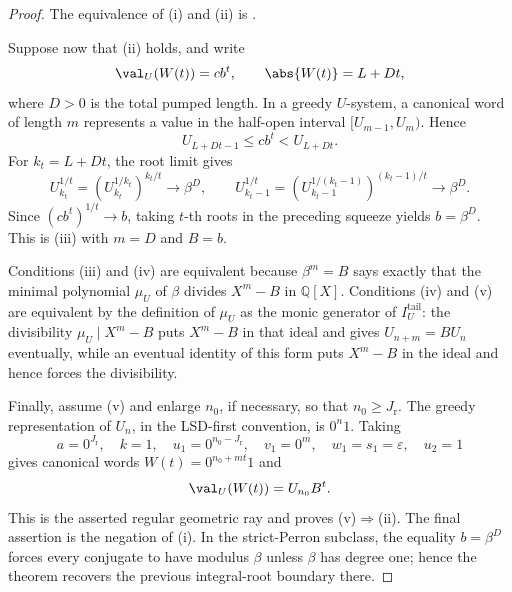 \begin{proof}
  The equivalence of \textup{(i)} and \textup{(ii)} is
  .

  

  Suppose now that \textup{(ii)} holds, and write
  \[
    \val_U(W(t))=cb^t,
    \qquad \abs{W(t)}=L+Dt,
  \]
  where \(D>0\) is the total pumped length.  In a greedy \(U\)-system, a
  canonical word of length \(m\) represents a value in the half-open interval
  \([U_{m-1},U_m)\).  Hence
  \[
    U_{L+Dt-1}\le cb^t<U_{L+Dt}.
  \]
  For \(k_t=L+Dt\), the root limit gives
  \[
    U_{k_t}^{1/t}
      =\left(U_{k_t}^{1/k_t}\right)^{k_t/t}\longrightarrow\beta^D,
    \qquad
    U_{k_t-1}^{1/t}
      =\left(U_{k_t-1}^{1/(k_t-1)}\right)^{(k_t-1)/t}
       \longrightarrow\beta^D.
  \]
  Since \((cb^t)^{1/t}\to b\), taking \(t\)-th roots in the preceding
  squeeze yields \(b=\beta^D\). This is \textup{(iii)} with \(m=D\) and
  \(B=b\).

  Conditions \textup{(iii)} and \textup{(iv)} are equivalent because
  \(\beta^m=B\) says exactly that the minimal polynomial \(\mu_U\) of
  \(\beta\) divides \(X^m-B\) in \(\mathbb Q[X]\). Conditions
  \textup{(iv)} and \textup{(v)} are equivalent by the definition of
  \(\mu_U\) as the monic generator of \(I_U^{\mathrm{tail}}\): the
  divisibility \(\mu_U\mid X^m-B\) puts \(X^m-B\) in that ideal and gives
  \(U_{n+m}=BU_n\) eventually, while an eventual identity of this form
  puts \(X^m-B\) in the ideal and hence forces the divisibility.

  Finally, assume \textup{(v)} and enlarge \(n_0\), if necessary, so that
  \(n_0\ge J_{\mathrm r}\). The greedy representation of \(U_n\), in the
  LSD-first convention, is \(0^n1\). Taking
  \[
    a=0^{J_{\mathrm r}},\quad k=1,\quad
    u_1=0^{n_0-J_{\mathrm r}},\quad v_1=0^m,\quad
    w_1=s_1=\varepsilon,\quad u_2=1
  \]
  gives canonical words \(W(t)=0^{n_0+mt}1\) and
  \[
    \val_U(W(t))=U_{n_0}B^t.
  \]
  This is the asserted regular geometric ray and proves
  \textup{(v)}\(\Rightarrow\)\textup{(ii)}. The final assertion is the
  negation of \textup{(i)}. In the strict-Perron subclass, the equality
  \(b=\beta^D\) forces every conjugate to have modulus \(\beta\) unless
  \(\beta\) has degree one; hence the theorem recovers the previous
  integral-root boundary there.
\end{proof}

